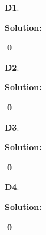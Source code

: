\documentclass{article}
\newenvironment{problem}[1]
{
  \begin{flushleft}
  \textbf{#1}.
  \ignorespaces
}
{
  \end{flushleft}
}
\newenvironment{solution}
{
  \ignorespaces
  \textbf{Solution:}
}
{
  \ignorespacesafterend
  \begin{flushright}
  {\bfseries \qed}
  \end{flushright}
}
\begin{document}
\begin{problem}{D1}

\end{problem}
\begin{solution}

\end{solution}

\begin{problem}{D2}

\end{problem}
\begin{solution}

\end{solution}

\begin{problem}{D3}

\end{problem}
\begin{solution}

\end{solution}

\begin{problem}{D4}

\end{problem}
\begin{solution}

\end{solution}
\end{document}
